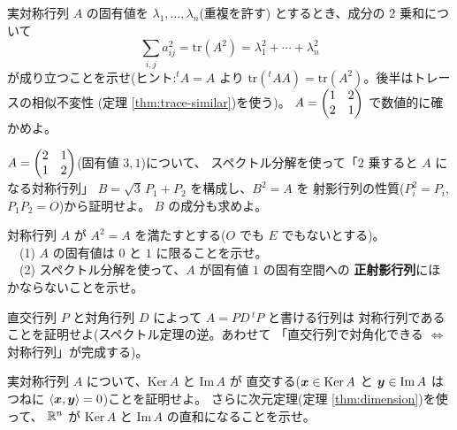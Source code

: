 \begin{mondai}[標準]\label{q:spec-ex8}
実対称行列 $A$ の固有値を $\lambda_1, \dots, \lambda_n$(重複を許す)
とするとき、成分の $2$ 乗和について
\[
\sum_{i,j} a_{ij}^2 = \mathrm{tr}(A^2) = \lambda_1^2 + \cdots + \lambda_n^2
\]
が成り立つことを示せ(ヒント:${}^t\!A = A$ より
$\mathrm{tr}({}^t\!AA) = \mathrm{tr}(A^2)$。後半はトレースの相似不変性
(定理 \ref{thm:trace-similar})を使う)。
$A = \begin{pmatrix}1 & 2 \\ 2 & 1\end{pmatrix}$ で数値的に確かめよ。
\end{mondai}

\begin{mondai}[発展]\label{q:spec-ex9}
$A = \begin{pmatrix}2 & 1 \\ 1 & 2\end{pmatrix}$(固有値 $3, 1$)について、
スペクトル分解を使って「$2$ 乗すると $A$ になる対称行列」
$B = \sqrt{3}\,P_1 + P_2$ を構成し、$B^2 = A$ を
射影行列の性質($P_i^2 = P_i$, $P_1P_2 = O$)から証明せよ。
$B$ の成分も求めよ。
\end{mondai}

\begin{mondai}[発展]\label{q:spec-ex10}
対称行列 $A$ が $A^2 = A$ を満たすとする($O$ でも $E$ でもないとする)。\\
　(1) $A$ の固有値は $0$ と $1$ に限ることを示せ。\\
　(2) スペクトル分解を使って、$A$ が固有値 $1$ の固有空間への
\textbf{正射影行列}にほかならないことを示せ。
\end{mondai}

\begin{mondai}[証明]\label{q:spec-ex11}
直交行列 $P$ と対角行列 $D$ によって $A = PD\,{}^t\!P$ と書ける行列は
対称行列であることを証明せよ(スペクトル定理の逆。あわせて
「直交行列で対角化できる $\iff$ 対称行列」が完成する)。
\end{mondai}

\begin{mondai}[証明]\label{q:spec-ex12}
実対称行列 $A$ について、$\mathrm{Ker}\,A$ と $\mathrm{Im}\,A$ が
直交する($\bm{x} \in \mathrm{Ker}\,A$ と
$\bm{y} \in \mathrm{Im}\,A$ はつねに
$\langle \bm{x}, \bm{y} \rangle = 0$)ことを証明せよ。
さらに次元定理(定理 \ref{thm:dimension})を使って、
$\mathbb{R}^n$ が $\mathrm{Ker}\,A$ と $\mathrm{Im}\,A$ の直和になることを示せ。
\end{mondai}

